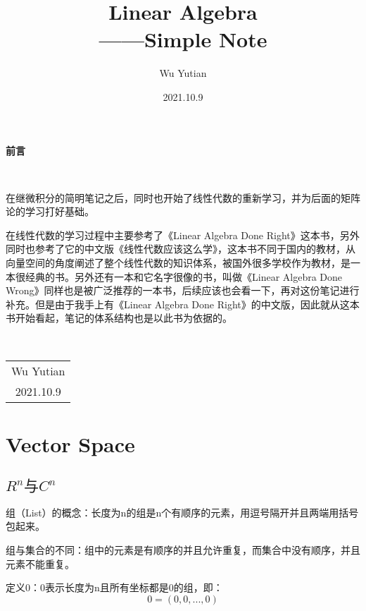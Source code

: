 \documentclass[11pt, b5paper, oneside]{book}
\title{{\Huge{\textbf{Linear Algebra }}}\\——Simple Note}
\author{Wu Yutian}
\date{2021.10.9}
\begin{document}
\maketitle

\setcounter{page}{1}

\begin{center}
    \Huge\textbf{前言}
\end{center}~\

在继微积分的简明笔记之后，同时也开始了线性代数的重新学习，并为后面的矩阵论的学习打好基础。

在线性代数的学习过程中主要参考了《Linear Algebra Done Right》这本书，另外同时也参考了它的中文版《线性代数应该这么学》，这本书不同于国内的教材，从向量空间的角度阐述了整个线性代数的知识体系，被国外很多学校作为教材，是一本很经典的书。另外还有一本和它名字很像的书，叫做《Linear Algebra Done Wrong》同样也是被广泛推荐的一本书，后续应该也会看一下，再对这份笔记进行补充。但是由于我手上有《Linear Algebra Done Right》的中文版，因此就从这本书开始看起，笔记的体系结构也是以此书为依据的。

~\\
\begin{flushright}
    \begin{tabular}{c}
        Wu Yutian\\
        2021.10.9
    \end{tabular}
\end{flushright}

\newpage
{}
\setcounter{page}{1}
\tableofcontents
\newpage
\setcounter{page}{1}

\chapter{Vector Space}

\section{$R^n \text{与} C^n$}

组（List）的概念：长度为n的组是n个有顺序的元素，用逗号隔开并且两端用括号包起来。

组与集合的不同：组中的元素是有顺序的并且允许重复，而集合中没有顺序，并且元素不能重复。

定义0：0表示长度为n且所有坐标都是0的组，即：\[0=(0,0,...,0)\]
\end{document}
